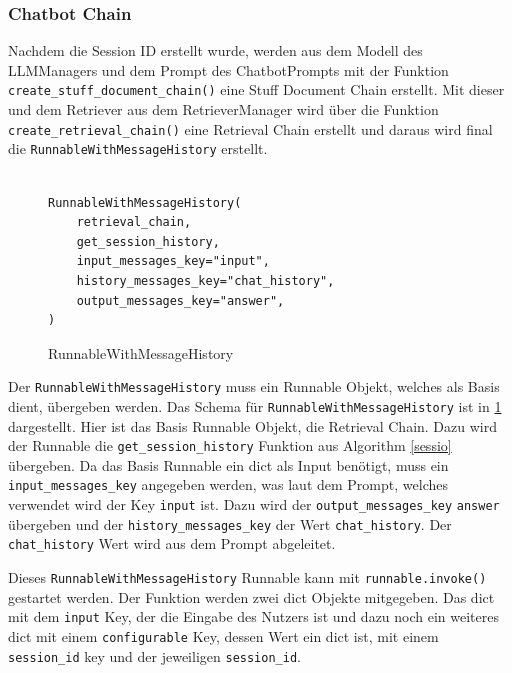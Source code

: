 \subsubsection{Chatbot Chain}
Nachdem die Session ID erstellt wurde, werden aus dem Modell des LLMManagers und dem 
Prompt des ChatbotPrompts mit der Funktion \verb|create_stuff_document_chain()| eine Stuff 
Document Chain erstellt. Mit dieser und dem Retriever aus dem RetrieverManager wird über die Funktion \verb|create_retrieval_chain()|
eine Retrieval Chain erstellt und daraus wird final die \verb|RunnableWithMessageHistory| erstellt.\par


\begin{figure}[H]
\begin{verbatim}

RunnableWithMessageHistory(
    retrieval_chain,
    get_session_history,
    input_messages_key="input",
    history_messages_key="chat_history",
    output_messages_key="answer",
)
\end{verbatim}
\caption{RunnableWithMessageHistory}
\label{runnable}
\end{figure}


Der \verb|RunnableWithMessageHistory| muss ein Runnable Objekt,
 welches als Basis dient, übergeben werden. Das Schema für \verb|RunnableWithMessageHistory| ist in \ref{runnable} dargestellt. 
 Hier ist das Basis Runnable Objekt, 
die Retrieval Chain.
Dazu wird der Runnable die \verb|get_session_history| Funktion aus Algorithm \ref{sessio} übergeben.
Da das Basis Runnable ein dict als Input benötigt, muss ein \verb|input_messages_key|
angegeben werden, was laut dem Prompt, welches verwendet wird der Key \verb|input| ist. 
Dazu wird der \verb|output_messages_key| \verb|answer| übergeben und der \verb|history_messages_key| der Wert 
\verb|chat_history|. Der \verb|chat_history| Wert wird aus dem Prompt abgeleitet.\par\par

Dieses \verb|RunnableWithMessageHistory| Runnable kann mit \verb|runnable.invoke()| gestartet werden.
Der Funktion werden zwei dict Objekte mitgegeben. 
Das dict mit dem \verb|input| Key, der die Eingabe des 
Nutzers ist und dazu noch ein weiteres dict mit einem 
\verb|configurable| Key, dessen Wert ein dict ist, 
mit einem \verb|session_id| key und der jeweiligen \verb|session_id|. \par

